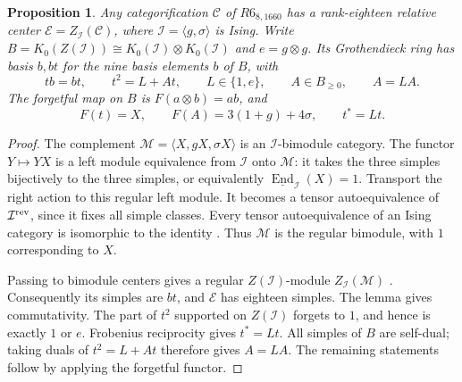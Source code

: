 \documentclass[11pt]{article}
\newtheorem{proposition}{Proposition}
\begin{document}
\begin{proposition}
Any categorification $\mathcal C$ of $R6_{8,1660}$ has a rank-eighteen
relative center $\mathcal E=Z_{\mathcal I}(\mathcal C)$, where
$\mathcal I=\langle g,\sigma\rangle$ is Ising. Write
$B=K_0(Z(\mathcal I))\cong K_0(\mathcal I)\otimes K_0(\mathcal I)$ and
$e=g\otimes g$. Its Grothendieck ring has basis $b,bt$ for the nine
basis elements $b$ of $B$, with
\[
 tb=bt,\qquad t^2=L+At,\qquad L\in\{1,e\},\qquad A\in B_{\ge0},
 \qquad A=LA.
\]
The forgetful map on $B$ is $F(a\otimes b)=ab$, and
\[
 F(t)=X,\qquad F(A)=3(1+g)+4\sigma,\qquad t^*=Lt.
\]
\end{proposition}
\begin{proof}
The complement $\mathcal M=\langle X,gX,\sigma X\rangle$ is an
$\mathcal I$-bimodule category. The functor $Y\mapsto YX$ is a left
module equivalence from $\mathcal I$ onto $\mathcal M$: it takes the
three simples bijectively to the three simples, or equivalently
$\underline{\operatorname{End}}_{\mathcal I}(X)=1$.
Transport the right action to this regular left module. It becomes a
tensor autoequivalence of $\mathcal I^{\rm rev}$, since it fixes all
simple classes. Every tensor autoequivalence of an Ising category is
isomorphic to the identity \cite[Remark B.6(i)]{DGNO}. Thus
$\mathcal M$ is the regular bimodule, with $1$ corresponding to $X$.

Passing to bimodule centers gives a regular $Z(\mathcal I)$-module
$Z_{\mathcal I}(\mathcal M)$ \cite[Definition 2.1 and Remark 2.2]{GNN}.
Consequently its simples are $bt$, and $\mathcal E$ has eighteen
simples. The lemma gives commutativity. The part of $t^2$ supported on
$Z(\mathcal I)$ forgets to $1$, and hence is exactly $1$ or $e$.
Frobenius reciprocity gives $t^*=Lt$. All simples of $B$ are self-dual;
taking duals of $t^2=L+At$ therefore gives $A=LA$. The remaining
statements follow by applying the forgetful functor.
\end{proof}
\end{document}
